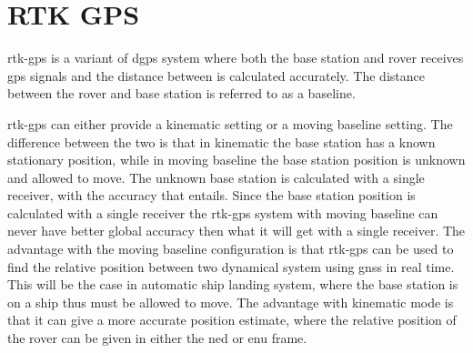 \section{RTK GPS}\label{ss:rtk-gps}
\acrfull{rtk-gps} is a variant of \gls{dgps} system where both the base station and rover receives \gls{gps} signals and the distance between is calculated accurately. The distance between the rover and base station is referred to as a baseline.

\gls{rtk-gps} can either provide a kinematic setting or a moving baseline setting. The difference between the two is that in kinematic the base station has a known stationary position, while in moving baseline the base station position is unknown and allowed to move. The unknown base station is calculated with a single receiver, with the accuracy that entails. Since the base station position is calculated with a single receiver the \gls{rtk-gps} system with moving baseline can never have better global accuracy then what it will get with a single receiver. The advantage with the moving baseline configuration is that \gls{rtk-gps} can be used to find the relative position between two dynamical system using \gls{gnss} in real time. This will be the case in automatic ship landing system, where the base station is on a ship thus must be allowed to move. The advantage with kinematic mode is that it can give a more accurate position estimate, where the relative position of the rover can be given in either the \gls{ned} or {enu} frame.
\cleardoublepage